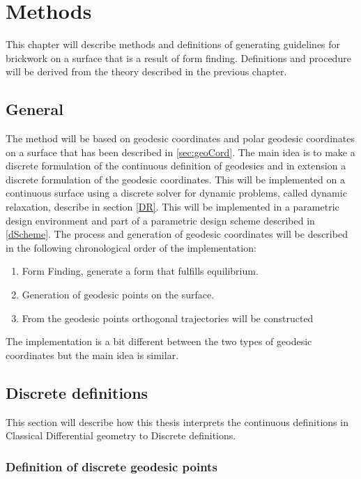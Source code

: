 \chapter{Methods}


This chapter will describe methods and definitions of generating guidelines for brickwork on a surface that is a result of form finding. Definitions and procedure will be derived from the theory described in the previous chapter.   


\section{General}

The method will be based on geodesic coordinates and polar geodesic coordinates on a surface that has been described in \ref{sec:geoCord}. The main idea is to make a discrete formulation of the continuous definition of geodesics and in extension a discrete formulation of the geodesic coordinates. This will be implemented on a continuous surface using a discrete solver for dynamic problems, called dynamic relaxation, describe in section \ref{DR}. This will be implemented in a parametric design environment and part of a parametric design scheme described in \ref{dScheme}. The process and generation of geodesic coordinates will be described in the following chronological order of the implementation:
\vspace{5mm}
\begin{enumerate}
\item Form Finding, generate a form that fulfills equilibrium.
\item Generation of geodesic points on the surface.
\item From the geodesic points orthogonal trajectories will be constructed 
\end{enumerate}
\vspace{5mm}
The implementation is a bit different between the two types of geodesic coordinates but the main idea is similar.

\section{Discrete definitions}
This section will describe how this thesis interprets the continuous definitions in Classical Differential geometry to Discrete definitions. 
\subsection{Definition of discrete geodesic points}

